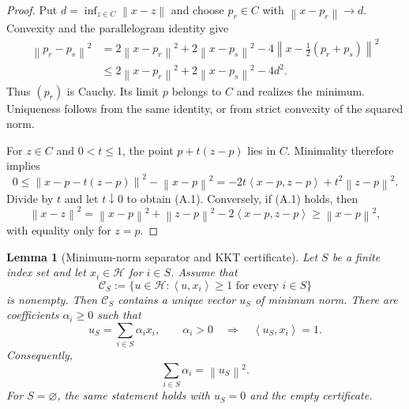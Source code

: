 \documentclass[11pt]{article}
\newtheorem{lemma}[theorem]{Lemma}
\theoremstyle{definition}
\theoremstyle{remark}
\newcommand{\Hh}{\mathcal H}
\newcommand{\ip}[2]{\left\langle #1,#2\right\rangle}
\newcommand{\norm}[1]{\left\lVert #1\right\rVert}
\begin{document}
\begin{proof}
Put \(d=\inf_{z\in C}\norm{x-z}\) and choose \(p_r\in C\) with
\(\norm{x-p_r}\to d\). Convexity and the parallelogram identity give
\[
 \begin{aligned}
 \norm{p_r-p_s}^2
 &=2\norm{x-p_r}^2+2\norm{x-p_s}^2
   -4\norm{x-\tfrac12(p_r+p_s)}^2\\
 &\le2\norm{x-p_r}^2+2\norm{x-p_s}^2-4d^2.
 \end{aligned}
\]
Thus \((p_r)\) is Cauchy. Its limit \(p\) belongs to \(C\) and realizes the
minimum. Uniqueness follows from the same identity, or from strict convexity
of the squared norm.

For \(z\in C\) and \(0<t\le1\), the point \(p+t(z-p)\) lies in \(C\).
Minimality therefore implies
\[
 0\le
 \norm{x-p-t(z-p)}^2-\norm{x-p}^2
 =
 -2t\ip{x-p}{z-p}+t^2\norm{z-p}^2.
\]
Divide by \(t\) and let \(t\downarrow0\) to obtain (A.1). Conversely, if
(A.1) holds, then
\[
 \norm{x-z}^2
 =
 \norm{x-p}^2+\norm{z-p}^2-2\ip{x-p}{z-p}
 \ge\norm{x-p}^2,
\]
with equality only for \(z=p\).
\end{proof}

\begin{lemma}[Minimum-norm separator and KKT certificate]
\label{lem:kkt}
Let \(S\) be a finite index set and let \(x_i\in\Hh\) for \(i\in S\).
Assume that
\[
 \mathcal C_S
 :=
 \{u\in\Hh:\ip{u}{x_i}\ge1\text{ for every }i\in S\}
\]
is nonempty. Then \(\mathcal C_S\) contains a unique vector \(u_S\) of
minimum norm. There are coefficients \(\alpha_i\ge0\) such that
\[
 u_S=\sum_{i\in S}\alpha_i x_i,
 \qquad
 \alpha_i>0
 \quad\Longrightarrow\quad
 \ip{u_S}{x_i}=1.
\]
Consequently,
\[
 \boxed{\sum_{i\in S}\alpha_i=\norm{u_S}^2.}
 \tag{A.2}
\]
For \(S=\varnothing\), the same statement holds with \(u_S=0\) and the empty
certificate.
\end{lemma}
\end{document}
